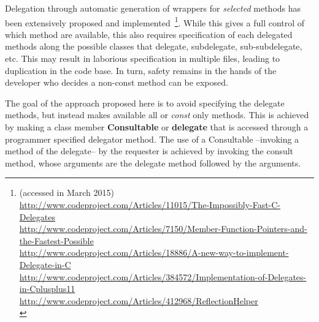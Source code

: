 \documentclass{article}
\begin{document}
Delegation through automatic generation of wrappers for \textit{selected} methods has been extensively proposed and implemented~\footnote{(accessed in March 2015)\\
\url{http://www.codeproject.com/Articles/11015/The-Impossibly-Fast-C-Delegates}\\
\url{http://www.codeproject.com/Articles/7150/Member-Function-Pointers-and-the-Fastest-Possible}\\
\url{http://www.codeproject.com/Articles/18886/A-new-way-to-implement-Delegate-in-C}\\
\url{http://www.codeproject.com/Articles/384572/Implementation-of-Delegates-in-Cplusplus11}\\
\url{http://www.codeproject.com/Articles/412968/ReflectionHelper}\\
}.  While this gives a full control of which method are available, this also requires specification of each delegated methods along the possible classes that delegate, subdelegate, sub-subdelegate, etc. This may result in laborious specification in multiple files, leading to duplication in the code base. In turn, safety remains in the hands of the developer who decides a non-const method can be exposed. 

The goal of the approach proposed here is to avoid specifying the delegate methods, but instead makes available all or \textit{const} only methods. This is achieved by making a class member \textbf{Consultable} or \textbf{delegate} that is accessed through a programmer specified delegator method. The use of a Consultable --invoking a method of the delegate-- by the requester is achieved by invoking the consult method, whose arguments are the delegate method followed by the arguments. 
\end{document}
